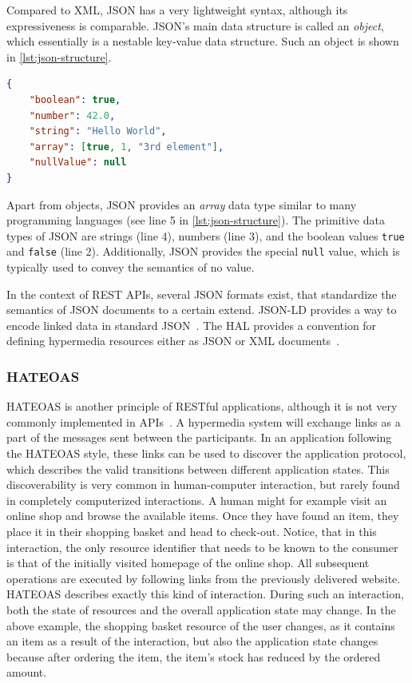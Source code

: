 Compared to \ac{XML}, \ac{JSON} has a very lightweight syntax, although its expressiveness is comparable.
\ac{JSON}'s main data structure is called an \textit{object}, which essentially is a nestable key-value data structure.
Such an object is shown in \autoref{lst:json-structure}.

\begin{lstlisting}[caption={\acs{JSON} Data Types and Structures}, label=lst:json-structure, language=json]
{
    "boolean": true,
    "number": 42.0,
    "string": "Hello World",
    "array": [true, 1, "3rd element"],
    "nullValue": null
}
\end{lstlisting}

Apart from objects, \ac{JSON} provides an \textit{array} data type similar to many programming languages (see line 5 in \autoref{lst:json-structure}).
The primitive data types of \ac{JSON} are strings (line 4), numbers (line 3), and the boolean values \texttt{true} and \texttt{false} (line 2).
Additionally, \ac{JSON} provides the special \texttt{null} value, which is typically used to convey the semantics of no value.

In the context of \ac{REST} \acp{API}, several \ac{JSON} formats exist, that standardize the semantics of \ac{JSON} documents to a certain extend.
JSON-LD provides a way to encode linked data in standard \ac{JSON}~\cite{Kellogg2020}.
The \ac{HAL} provides a convention for defining hypermedia resources either as \ac{JSON} or \ac{XML} documents~\cite{HALdraft}.

\subsubsection{\acf{HATEOAS}}

\ac{HATEOAS} is another principle of \ac{REST}ful applications, although it is not very commonly implemented in \acp{API}~\cite{Liskin2011,Webber2010}.
A hypermedia system will exchange links as a part of the messages sent between the participants.
In an application following the \ac{HATEOAS} style, these links can be used to discover the application protocol, which describes the valid transitions between different application states.
This discoverability is very common in human-computer interaction, but rarely found in completely computerized interactions.
A human might for example visit an online shop and browse the available items.
Once they have found an item, they place it in their shopping basket and head to check-out.
Notice, that in this interaction, the only resource identifier that needs to be known to the consumer is that of the initially visited homepage of the online shop.
All subsequent operations are executed by following links from the previously delivered website.
\ac{HATEOAS} describes exactly this kind of interaction.
During such an interaction, both the state of resources and the overall application state may change.
In the above example, the shopping basket resource of the user changes, as it contains an item as a result of the interaction, but also the application state changes because after ordering the item, the item's stock has reduced by the ordered amount.

